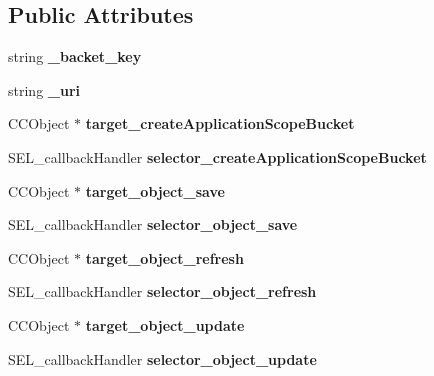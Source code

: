 \subsection*{Public Attributes}
\begin{DoxyCompactItemize}
\item 
\hypertarget{class_c_kii_bucket_ae62e874439f55143f8009f88da23bc99}{string {\bfseries \-\_\-backet\-\_\-key}}\label{class_c_kii_bucket_ae62e874439f55143f8009f88da23bc99}

\item 
\hypertarget{class_c_kii_bucket_aa18c6b0053f2e0a2a07c33e5dc490802}{string {\bfseries \-\_\-uri}}\label{class_c_kii_bucket_aa18c6b0053f2e0a2a07c33e5dc490802}

\item 
\hypertarget{class_c_kii_bucket_ab0a3c000da769ed033a6d2354db3221a}{C\-C\-Object $\ast$ {\bfseries target\-\_\-create\-Application\-Scope\-Bucket}}\label{class_c_kii_bucket_ab0a3c000da769ed033a6d2354db3221a}

\item 
\hypertarget{class_c_kii_bucket_a4a5b74eb7eea8c621668c2cd8a5f7cb4}{S\-E\-L\-\_\-callback\-Handler {\bfseries selector\-\_\-create\-Application\-Scope\-Bucket}}\label{class_c_kii_bucket_a4a5b74eb7eea8c621668c2cd8a5f7cb4}

\item 
\hypertarget{class_c_kii_bucket_a6f53d63ed58db2db7f10f8067d160203}{C\-C\-Object $\ast$ {\bfseries target\-\_\-object\-\_\-save}}\label{class_c_kii_bucket_a6f53d63ed58db2db7f10f8067d160203}

\item 
\hypertarget{class_c_kii_bucket_a90b8bf7cb1cc5ed6c299a574833f3fd2}{S\-E\-L\-\_\-callback\-Handler {\bfseries selector\-\_\-object\-\_\-save}}\label{class_c_kii_bucket_a90b8bf7cb1cc5ed6c299a574833f3fd2}

\item 
\hypertarget{class_c_kii_bucket_a8c0104fa7149cab6e17f61bc19f1f9da}{C\-C\-Object $\ast$ {\bfseries target\-\_\-object\-\_\-refresh}}\label{class_c_kii_bucket_a8c0104fa7149cab6e17f61bc19f1f9da}

\item 
\hypertarget{class_c_kii_bucket_ac9e641126b3d8315b2b41c55f829190b}{S\-E\-L\-\_\-callback\-Handler {\bfseries selector\-\_\-object\-\_\-refresh}}\label{class_c_kii_bucket_ac9e641126b3d8315b2b41c55f829190b}

\item 
\hypertarget{class_c_kii_bucket_aa616408b44438626c91901fadf0c5887}{C\-C\-Object $\ast$ {\bfseries target\-\_\-object\-\_\-update}}\label{class_c_kii_bucket_aa616408b44438626c91901fadf0c5887}

\item 
\hypertarget{class_c_kii_bucket_ad840394a0cc208a1fd19ba0a0b147f5e}{S\-E\-L\-\_\-callback\-Handler {\bfseries selector\-\_\-object\-\_\-update}}\label{class_c_kii_bucket_ad840394a0cc208a1fd19ba0a0b147f5e}

\end{DoxyCompactItemize}



